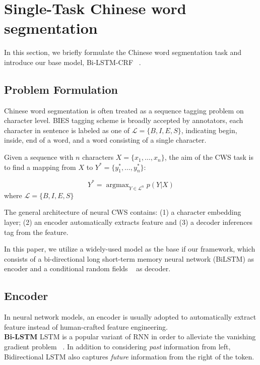\section{Single-Task Chinese word segmentation}\label{sec:single-task}

In this section, we briefly formulate the Chinese word segmentation task and introduce our base model, Bi-LSTM-CRF ~\cite{DBLP:journals/corr/HuangXY15}.

\subsection{Problem Formulation}

Chinese word segmentation is often treated as a sequence tagging problem on character level. BIES tagging scheme is broadly accepted by annotators, each character in sentence is labeled as one of $\mathcal{L} = \{B, I, E, S\}$, indicating begin, inside, end of a word, and a word consisting of a single character. 

Given a sequence with $n$ characters $X = \{x_1, \ldots, x_n \}$, the aim of the CWS task is to find a mapping from $X$ to $Y^\ast = \{y_1^\ast, \ldots, y_n^\ast\}$:

\small
\begin{equation} \label{eq:1}
Y^\ast = \mathop{\arg\max}_{Y \in \mathcal{L}^n} p(Y | X)
\end{equation}
\normalsize
where $\mathcal{L} = \{B, I, E, S\}$

The general architecture of neural CWS contains: (1) a character embedding layer; (2) an encoder automatically extracts feature and (3) a decoder inferences tag from the feature.

In this paper, we utilize a widely-used model as the base if our framework, which consists of a bi-directional long short-term memory neural network (BiLSTM) as encoder and a conditional random fields ~\cite{lafferty2001conditional} as decoder.

\subsection{Encoder}

In neural network models, an encoder is usually adopted to automatically extract feature instead of human-crafted feature engineering.\\

\noindent \textbf{Bi-LSTM} \quad LSTM is a popular variant of RNN in order to alleviate the vanishing gradient problem ~\cite{Bengio:1994:LLD:2325857.2328340,Hochreiter:1997}. In addition to considering \textit{past} information from left, Bidirectional LSTM also captures \textit{future} information from the right of the token.

